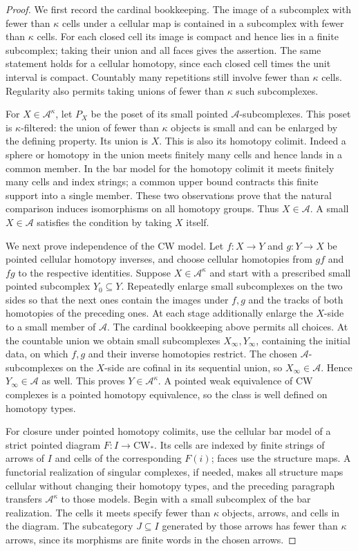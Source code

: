 \begin{proof}
We first record the cardinal bookkeeping. The image of a subcomplex with fewer than $\kappa$ cells under a cellular map is contained in a subcomplex with fewer than $\kappa$ cells. For each closed cell its image is compact and hence lies in a finite subcomplex; taking their union and all faces gives the assertion. The same statement holds for a cellular homotopy, since each closed cell times the unit interval is compact. Countably many repetitions still involve fewer than $\kappa$ cells. Regularity also permits taking unions of fewer than $\kappa$ such subcomplexes.

For $X\in\mathcal A^\kappa$, let $P_X$ be the poset of its small pointed $\mathcal A$-subcomplexes. This poset is $\kappa$-filtered: the union of fewer than $\kappa$ objects is small and can be enlarged by the defining property. Its union is $X$. This is also its homotopy colimit. Indeed a sphere or homotopy in the union meets finitely many cells and hence lands in a common member. In the bar model for the homotopy colimit it meets finitely many cells and index strings; a common upper bound contracts this finite support into a single member. These two observations prove that the natural comparison induces isomorphisms on all homotopy groups. Thus $X\in\mathcal A$. A small $X\in\mathcal A$ satisfies the condition by taking $X$ itself.

We next prove independence of the CW model. Let $f:X\to Y$ and $g:Y\to X$ be pointed cellular homotopy inverses, and choose cellular homotopies from $gf$ and $fg$ to the respective identities. Suppose $X\in\mathcal A^\kappa$ and start with a prescribed small pointed subcomplex $Y_0\subseteq Y$. Repeatedly enlarge small subcomplexes on the two sides so that the next ones contain the images under $f,g$ and the tracks of both homotopies of the preceding ones. At each stage additionally enlarge the $X$-side to a small member of $\mathcal A$. The cardinal bookkeeping above permits all choices. At the countable union we obtain small subcomplexes $X_\infty,Y_\infty$, containing the initial data, on which $f,g$ and their inverse homotopies restrict. The chosen $\mathcal A$-subcomplexes on the $X$-side are cofinal in its sequential union, so $X_\infty\in\mathcal A$. Hence $Y_\infty\in\mathcal A$ as well. This proves $Y\in\mathcal A^\kappa$. A pointed weak equivalence of CW complexes is a pointed homotopy equivalence, so the class is well defined on homotopy types.

For closure under pointed homotopy colimits, use the cellular bar model of a strict pointed diagram $F:I\to\mathrm{CW}_*$. Its cells are indexed by finite strings of arrows of $I$ and cells of the corresponding $F(i)$; faces use the structure maps. A functorial realization of singular complexes, if needed, makes all structure maps cellular without changing their homotopy types, and the preceding paragraph transfers $\mathcal A^\kappa$ to those models. Begin with a small subcomplex of the bar realization. The cells it meets specify fewer than $\kappa$ objects, arrows, and cells in the diagram. The subcategory $J\subseteq I$ generated by those arrows has fewer than $\kappa$ arrows, since its morphisms are finite words in the chosen arrows.


\end{proof}
